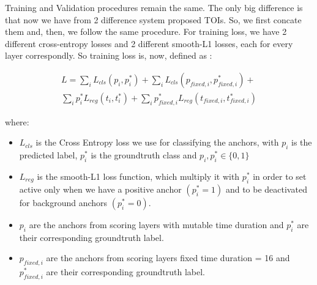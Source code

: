 \par
Training and Validation procedures remain the same. The only big difference is that now we have from 2 difference system proposed TOIs. So, we first concate
them and, then, we follow the same procedure. For training loss, we have 2 different cross-entropy losses and 2 different smooth-L1 losses, each for every
layer correspondly. So training loss is, now, defined as :





\begin{equation} 
\begin{split}
 L  =  \sum_iL_{cls}(p_i, p_i^*) + \sum_iL_{cls}(p_{fixed,i}, p_{fixed,i}^*) + \\
   \sum_ip_i^*L_{reg}(t_i,t_i^*) + \sum_ip_{fixed,i}^*L_{reg}(t_{fixed,i},t_{fixed,i}^*) 
\end{split}
\end{equation}

where:
\begin{itemize}
  \item $L_{cls} $ is the Cross Entropy loss we use for classifying the anchors, with $p_i$ is the predicted label, $p_i^*$ is the groundtruth class and
  $p_i, p_i^* \in \{0,1\}$
\item $L_{reg} $ is the smooth-L1 loss function, which multiply it with $p_i^*$ in order to set active only when we have a positive anchor $(p_i^* = 1)$
  and to be deactivated for background anchors $(p_i^* = 0)$.
\item $p_i $ are the anchors from scoring layers with mutable time duration and $p_i^*$ are their corresponding groundtruth label.
\item $p_{fixed,i} $ are the anchors from scoring layers fixed time duration = 16 and $p_{fixed,i}^*$ are their corresponding groundtruth label.
\end{itemize}

